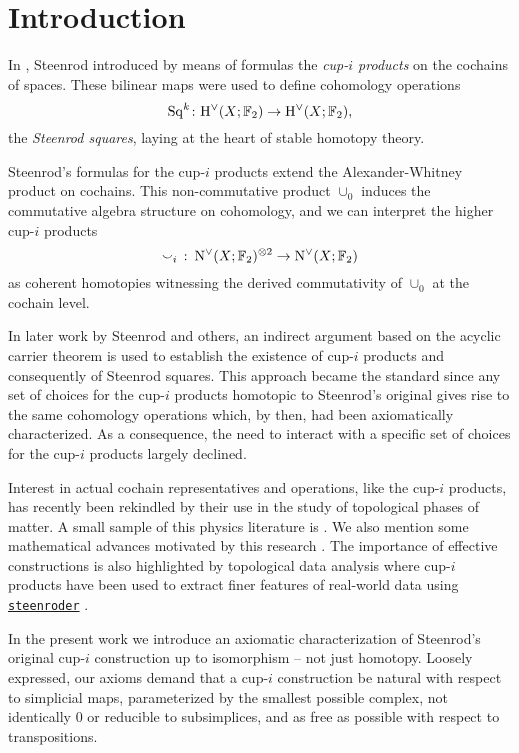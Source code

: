 
\section{Introduction} \label{s:introduction}

In \cite{steenrod1947products}, Steenrod introduced by means of formulas the \textit{\mbox{cup-$i$} products} on the cochains of spaces.
These bilinear maps were used to define cohomology operations
\[
\mathrm{Sq}^k \colon \mathrm{H}^\vee(X; {\mathbb{F}_2}) \to \mathrm{H}^\vee(X; {\mathbb{F}_2}),
\]
the \textit{Steenrod squares}, laying at the heart of stable homotopy theory.

Steenrod's formulas for the \mbox{cup-$i$} products extend the Alexander-Whitney product on cochains.
This non-commutative product $\cup_0$ induces the commutative algebra structure on cohomology, and we can interpret the higher \mbox{cup-$i$} products
\[
\smallsmile_i\ \colon \operatorname{N^{\vee}}(X; {\mathbb{F}_2})^{\otimes 2} \to \operatorname{N^{\vee}}(X; {\mathbb{F}_2})
\]
as coherent homotopies witnessing the derived commutativity of $\cup_0$ at the cochain level.

In later work by Steenrod and others, an indirect argument based on the acyclic carrier theorem is used to establish the existence of \mbox{cup-$i$} products and consequently of Steenrod squares.
This approach became the standard since any set of choices for the \mbox{cup-$i$} products homotopic to Steenrod's original gives rise to the same cohomology operations which, by then, had been axiomatically characterized.
As a consequence, the need to interact with a specific set of choices for the \mbox{cup-$i$} products largely declined.

Interest in actual cochain representatives and operations, like the \mbox{cup-$i$} products, has recently been rekindled by their use in the study of topological phases of matter.
A small sample of this physics literature is \cite{gaiotto2016spin, kapustin2017fermionic, meng2018classification, wang2020construction, barkeshli2021classification, tata2021anomalies, tata2021cubical}.
We also mention some mathematical advances motivated by this research \cite{brumfiel2016pontrjagin, brumfiel2018pontrjagin, medina2020cartan, medina2021adem}.
The importance of effective constructions is also highlighted by topological data analysis where cup-$i$ products have been used to extract finer features of real-world data using \href{https://github.com/Steenroder/steenroder}{\texttt{steenroder}} \cite{medina2021per_st}.

In the present work we introduce an axiomatic characterization of Steenrod's original cup-$i$ construction up to isomorphism -- not just homotopy.
Loosely expressed, our axioms demand that a cup-$i$ construction be natural with respect to simplicial maps, parameterized by the smallest possible complex, not identically $0$ or reducible to subsimplices, and as free as possible with respect to transpositions.

